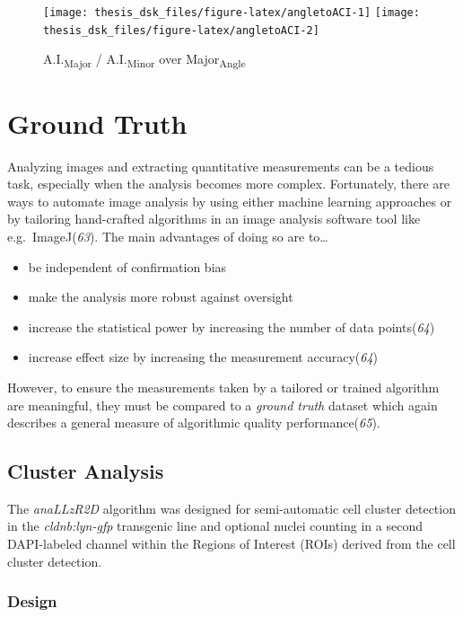 \documentclass[10pt, b5paper, singlespacinge, twoside]{reedthesis} %
\providecommand{\tightlist}{%
  \setlength{\itemsep}{0pt}\setlength{\parskip}{0pt}}
\theoremstyle{definition}
\theoremstyle{definition}
\theoremstyle{definition}
\theoremstyle{remark}
\begin{document}
\begin{figure}[H]

{\centering \texttt{[image: thesis\_dsk\_files/figure-latex/angletoACI-1]} \texttt{[image: thesis\_dsk\_files/figure-latex/angletoACI-2]} 

}

\caption{A.I.\textsubscript{Major} / A.I.\textsubscript{Minor} over Major\textsubscript{Angle}}\label{fig:angletoACI}
\end{figure}
\hypertarget{mat-GrTrDat}{%
\section{Ground Truth}\label{mat-GrTrDat}}

Analyzing images and extracting quantitative measurements can be a tedious task, especially when the analysis becomes more complex. Fortunately, there are ways to automate image analysis by using either machine learning approaches or by tailoring hand-crafted algorithms in an image analysis software tool like e.g.~ImageJ(\emph{63}).
The main advantages of doing so are to\ldots{}
\begin{itemize}
\tightlist
\item
  be independent of confirmation bias
\item
  make the analysis more robust against oversight
\item
  increase the statistical power by increasing the number of data points(\emph{64})
\item
  increase effect size by increasing the measurement accuracy(\emph{64})
\end{itemize}
However, to ensure the measurements taken by a tailored or trained algorithm are meaningful, they must be compared to a \emph{ground truth} dataset which again describes a general measure of algorithmic quality performance(\emph{65}).

\hypertarget{cluster-analysis}{%
\subsection{Cluster Analysis}\label{cluster-analysis}}

The \emph{anaLLzR2D} algorithm was designed for semi-automatic cell cluster detection in the \emph{cldnb:lyn-gfp} transgenic line and optional nuclei counting in a second DAPI-labeled channel within the Regions of Interest (ROIs) derived from the cell cluster detection.

\hypertarget{design}{%
\subsubsection{Design}\label{design}}
\end{document}
